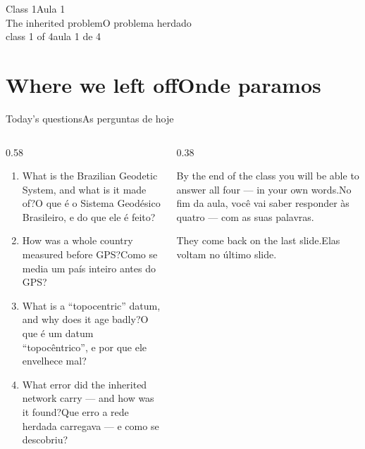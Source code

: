 \documentclass[aspectratio=169,11pt]{beamer}
\newcommand{\tr}[2]{\ifEN#2\else#1\fi}
\begin{document}
\begin{frame}[standout]
  \tr{Aula 1}{Class 1}\\[6pt]
  {\normalsize \tr{O problema herdado}{The inherited problem}}\\[4pt]
  {\scriptsize \tr{aula 1 de 4}{class 1 of 4}}
\end{frame}

\section{\tr{Onde paramos}{Where we left off}}

\begin{frame}{\tr{As perguntas de hoje}{Today's questions}}
  \begin{columns}[T]
    \begin{column}{0.58\textwidth}
      \begin{enumerate}
        \setlength{\itemsep}{8pt}
        \item \tr{O que é o Sistema Geodésico Brasileiro, e do que ele é feito?}{What is the
              Brazilian Geodetic System, and what is it made of?}
        \item \tr{Como se media um país inteiro antes do GPS?}{How was a whole country measured
              before GPS?}
        \item \tr{O que é um datum ``topocêntrico'', e por que ele envelhece mal?}{What is a
              ``topocentric'' datum, and why does it age badly?}
        \item \tr{Que erro a rede herdada carregava --- e como se descobriu?}{What error did the
              inherited network carry --- and how was it found?}
      \end{enumerate}
    \end{column}
    \begin{column}{0.38\textwidth}
      \begin{ideia}[title={\tr{Combinado}{Deal}}]
        \tr{No fim da aula, você vai saber responder às quatro --- com as suas
        palavras.}{By the end of the class you will be able to answer all four --- in your own
        words.}
        \medskip

        \tr{Elas voltam no último slide.}{They come back on the last slide.}
      \end{ideia}
    \end{column}
  \end{columns}
\end{frame}
\end{document}
